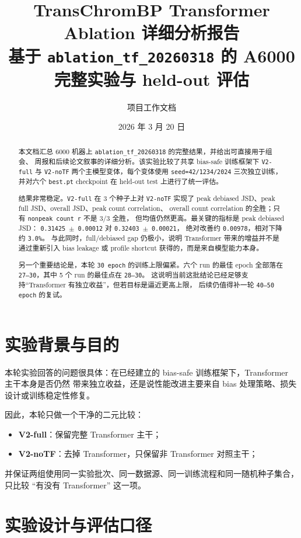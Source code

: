 \documentclass[11pt,a4paper]{ctexart}
\title{TransChromBP Transformer Ablation 详细分析报告\\
\large 基于 \texttt{ablation\_tf\_20260318} 的 A6000 完整实验与 held-out 评估}
\author{项目工作文档}
\date{2026 年 3 月 20 日}
\begin{document}
\maketitle

\begin{abstract}
本文档汇总 6000 机器上 \texttt{ablation\_tf\_20260318} 的完整结果，并给出可直接用于组会、
周报和后续论文叙事的详细分析。该实验比较了共享 bias-safe 训练框架下
\texttt{V2-full} 与 \texttt{V2-noTF} 两个主模型变体，每个变体使用
\texttt{seed=42/1234/2024} 三次独立训练，并对六个 \texttt{best.pt} checkpoint
在 held-out test 上进行了统一评估。

结果非常稳定。\texttt{V2-full} 在 3 个种子上对 \texttt{V2-noTF} 实现了
peak debiased JSD、peak full JSD、overall JSD、peak count correlation、
overall count correlation 的全胜；只有 \texttt{nonpeak count r} 不是 3/3 全胜，
但均值仍然更高。最关键的指标是 peak debiased JSD：
\texttt{0.31425 $\pm$ 0.00012} 对 \texttt{0.32403 $\pm$ 0.00021}，
绝对改善约 \texttt{0.00978}，相对下降约 \texttt{3.0\%}。
与此同时，full/debiased gap 仍极小，说明 Transformer 带来的增益并不是通过重新引入
bias leakage 或 profile shortcut 获得的，而是来自模型能力本身。

另一个重要结论是，本轮 \texttt{30 epoch} 的训练上限偏紧。六个 run 的最佳 epoch
全部落在 \texttt{27--30}，其中 5 个 run 的最佳点在 \texttt{28--30}。
这说明当前这批结论已经足够支持“Transformer 有独立收益”，但若目标是逼近更高上限，
后续仍值得补一轮 \texttt{40--50 epoch} 的复试。
\end{abstract}

\section{实验背景与目的}

本轮实验回答的问题很具体：在已经建立的 bias-safe 训练框架下，Transformer 主干本身是否仍然
带来独立收益，还是说性能改进主要来自 bias 处理策略、损失设计或训练稳定性修复。

因此，本轮只做一个干净的二元比较：
\begin{itemize}[leftmargin=2em]
  \item \textbf{V2-full}：保留完整 Transformer 主干；
  \item \textbf{V2-noTF}：去掉 Transformer，只保留非 Transformer 对照主干；
\end{itemize}
并保证两组使用同一实验批次、同一数据源、同一训练流程和同一随机种子集合，
只比较 ``有没有 Transformer'' 这一项。

\section{实验设计与评估口径}
\end{document}
